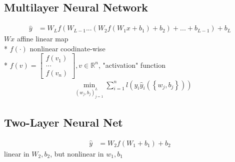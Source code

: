 \documentclass{article}
\begin{document}
\subsection{Multilayer Neural Network}
\begin{align*}
\hat{y} &= W_{L} f\left(W_{L-1} ... \left(W_{2} f\left(W_{1} x + b_{1}\right) + b_{2}\right) + ... + b_{L-1}\right) + b_{L}
\end{align*}
$W  x$ affine linear map
\\* $f\left(\cdot \right) $ nonlinear coodinate-wise
\\* $f\left(v\right)  = \begin{bmatrix} f\left(v_{1}\right) \\ ... \\ f\left(v_{n}\right) \end{bmatrix}, v \in \mathbb{R}^{n}$, "activation" function
\begin{align*}
&\displaystyle\min_{\left(w_{j}, b_{j}\right)_{j=1}^{L}} \displaystyle\sum_{i=1}^{n} l\left(y_{i} \hat{y}_{i}\left(\left\{w_{j}, b_{j}\right\}\right)\right)
\end{align*}


\subsection{Two-Layer Neural Net}
\begin{align*}
\hat{y} &= W_{2} f\left(W_{1} + b_{1}\right) + b_{2}
\end{align*}
linear in $W_{2}, b_{2}$, but nonlinear in $w_{1}, b_{1}$
\end{document}
